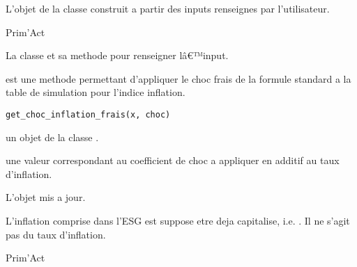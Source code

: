 \documentclass[a4paper]{book}
\begin{document}
%
\begin{Value}
L'objet de la classe  construit a partir des inputs renseignes par l'utilisateur.
\end{Value}
%
\begin{Author}\relax
Prim'Act
\end{Author}
%
\begin{SeeAlso}\relax
La classe  et sa methode 
pour renseigner lâ€™input.
\end{SeeAlso}
%
\begin{Description}\relax
{} est une methode permettant d'appliquer le choc frais
de la formule standard a la table de simulation pour l'indice inflation.
\end{Description}
%
\begin{Usage}
\begin{verbatim}
get_choc_inflation_frais(x, choc)
\end{verbatim}
\end{Usage}
%
\begin{Arguments}
\begin{ldescription}
\item[\code{x}] un objet de la classe .

\item[\code{choc}] une valeur  correspondant au coefficient de
choc a appliquer en additif au taux d'inflation.
\end{ldescription}
\end{Arguments}
%
\begin{Value}
L'objet  mis a jour.
\end{Value}
%
\begin{Note}\relax
L'inflation comprise dans l'ESG est suppose etre deja capitalise, i.e.
. Il ne s'agit pas du taux d'inflation.
\end{Note}
%
\begin{Author}\relax
Prim'Act
\end{Author}
\end{document}
